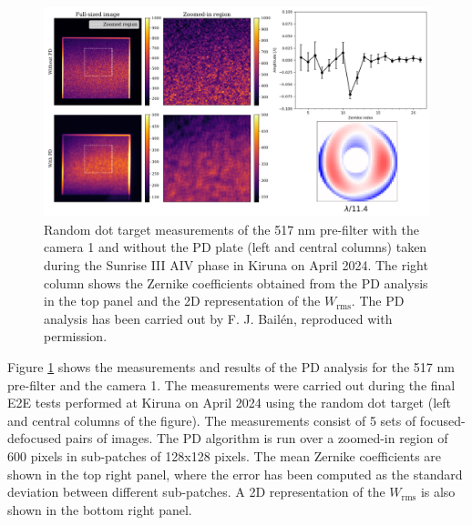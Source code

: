 \begin{figure}[t]
    \includegraphics[width=\textwidth]{figures/TuMag/PD_e2e.pdf}
    \caption[E2E PD analysis of TuMag's optical performance.]{Random dot target measurements of the 517 nm pre-filter with the camera 1 and without the PD plate (left and central columns) taken during the Sunrise III AIV phase in Kiruna on April 2024. The right column shows the Zernike coefficients obtained from the PD analysis in the top panel and the 2D representation of the $W_{\text{rms}}$. The PD analysis has been carried out by F. J. Bailén, reproduced with permission.}
      \label{tumag : PD}
\end{figure}

Figure \ref{tumag : PD} shows the measurements and results of the PD analysis for the 517 nm pre-filter and the camera 1. The measurements were carried out during the final E2E tests performed at Kiruna on April 2024 using the random dot target (left and central columns of the figure). The measurements consist of 5 sets of focused-defocused pairs of images. The PD algorithm is run over a zoomed-in region of 600 pixels in sub-patches of 128x128 pixels. The mean Zernike coefficients are shown in the top right panel, where the error has been computed as the standard deviation between different sub-patches. A 2D representation of the $W_{\text{rms}}$ is also shown in the bottom right panel. 

